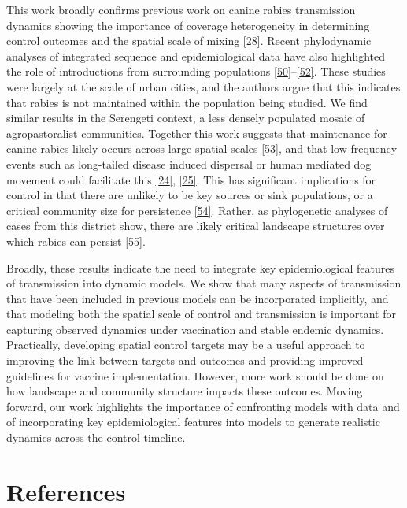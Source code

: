 \documentclass[
  oneside]{book}
\begin{document}
This work broadly confirms previous work on canine rabies transmission dynamics showing the importance of coverage heterogeneity in determining control outcomes and the spatial scale of mixing \protect\hyperlink{ref-Mancyinprep}{{[}28{]}}. Recent phylodynamic analyses of integrated sequence and epidemiological data have also highlighted the role of introductions from surrounding populations \protect\hyperlink{ref-zinsstag2017}{{[}50{]}}--\protect\hyperlink{ref-laager2019}{{[}52{]}}. These studies were largely at the scale of urban cities, and the authors argue that this indicates that rabies is not maintained within the population being studied. We find similar results in the Serengeti context, a less densely populated mosaic of agropastoralist communities. Together this work suggests that maintenance for canine rabies likely occurs across large spatial scales \protect\hyperlink{ref-hampson2007}{{[}53{]}}, and that low frequency events such as long-tailed disease induced dispersal or human mediated dog movement could facilitate this \protect\hyperlink{ref-talbi2010}{{[}24{]}}, \protect\hyperlink{ref-brunker2015}{{[}25{]}}. This has significant implications for control in that there are unlikely to be key sources or sink populations, or a critical community size for persistence \protect\hyperlink{ref-keeling1997}{{[}54{]}}. Rather, as phylogenetic analyses of cases from this district show, there are likely critical landscape structures over which rabies can persist \protect\hyperlink{ref-brunker2018}{{[}55{]}}.

Broadly, these results indicate the need to integrate key epidemiological features of transmission into dynamic models. We show that many aspects of transmission that have been included in previous models can be incorporated implicitly, and that modeling both the spatial scale of control and transmission is important for capturing observed dynamics under vaccination and stable endemic dynamics. Practically, developing spatial control targets may be a useful approach to improving the link between targets and outcomes and providing improved guidelines for vaccine implementation. However, more work should be done on how landscape and community structure impacts these outcomes. Moving forward, our work highlights the importance of confronting models with data and of incorporating key epidemiological features into models to generate realistic dynamics across the control timeline.

\hypertarget{references-4}{%
\section{References}\label{references-4}}
\end{document}
